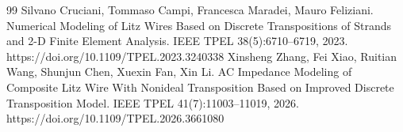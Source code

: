 \documentclass[11pt]{article}
\begin{document}
\clearpage
\begin{thebibliography}{99}
 Silvano Cruciani, Tommaso Campi, Francesca Maradei, Mauro Feliziani. Numerical Modeling of Litz Wires Based on Discrete Transpositions of Strands and 2-D Finite Element Analysis. IEEE TPEL 38(5):6710–6719, 2023. https://doi.org/10.1109/TPEL.2023.3240338
 Xinsheng Zhang, Fei Xiao, Ruitian Wang, Shunjun Chen, Xuexin Fan, Xin Li. AC Impedance Modeling of Composite Litz Wire With Nonideal Transposition Based on Improved Discrete Transposition Model. IEEE TPEL 41(7):11003–11019, 2026. https://doi.org/10.1109/TPEL.2026.3661080
\end{thebibliography}
\end{document}
